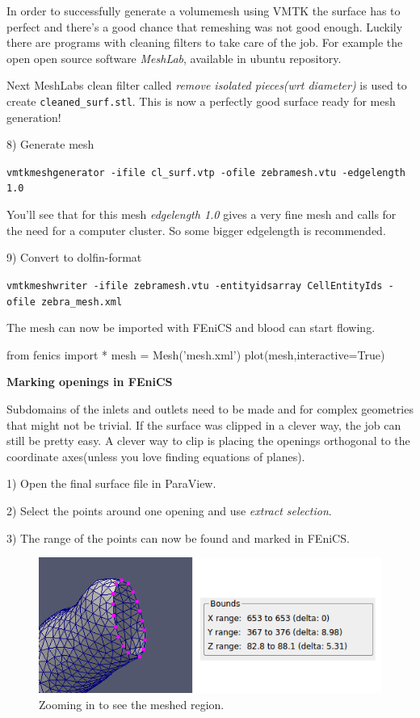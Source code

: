 \documentclass[epsfig,11pt]{article}
\begin{document}
In order to successfully generate a volumemesh using VMTK the surface has to perfect and there's a good chance that remeshing was not good enough. Luckily there are programs with cleaning filters to take care of the job. For example the open open source software \emph{MeshLab}, available in ubuntu repository. 

Next MeshLabs clean filter called \emph{remove isolated pieces(wrt diameter) } is used to create \texttt{cleaned\_surf.stl}. This is now a perfectly good surface ready for mesh generation!

8) Generate mesh
\begin{framed}       
    \texttt{vmtkmeshgenerator -ifile cl\_surf.vtp -ofile zebramesh.vtu -edgelength 1.0}
\end{framed}

You'll see that for this mesh \emph{edgelength 1.0} gives a very fine mesh and calls for the need for a computer cluster. So some bigger edgelength is recommended.

9) Convert to dolfin-format
\begin{framed}       
    \texttt{vmtkmeshwriter -ifile zebramesh.vtu -entityidsarray CellEntityIds -ofile zebra\_mesh.xml}
\end{framed}

The mesh can now be imported with FEniCS and blood can start flowing. 

\begin{python}
from fenics import *
mesh = Mesh('mesh.xml')
plot(mesh,interactive=True)
\end{python}

\textbf{Marking openings in FEniCS}

Subdomains of the inlets and outlets need to be made and for complex geometries that might not be trivial. If the surface was clipped in a clever way, the job can still be pretty easy. A clever way to clip is placing the openings orthogonal to the coordinate axes(unless you love finding equations of planes).

1) Open the final surface file in ParaView.

2) Select the points around one opening and use \emph{extract selection}.

3) The range of the points can now be found and marked in FEniCS.

\begin{figure}[h!] 
\begin{center}
  \includegraphics[scale=0.5]{marking.png}
  \end{center}
  \caption{Zooming in to see the meshed region.}
\end{figure}
\end{document}

